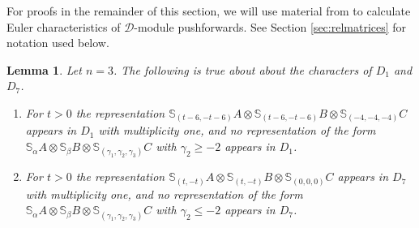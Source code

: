 \documentclass[11pt,reqno]{amsart}
\newcommand{\D}{\mathcal{D}}
\newcommand{\oo}{\otimes}
\newcommand{\bS}{\mathbb{S}}
\newtheorem{lemma}[theorem]{Lemma}
\numberwithin{equation}{section}
\begin{document}
For proofs in the remainder of this section, we will use material from \cite[Section 2]{raicu2016characters} to calculate Euler characteristics of $\D$-module pushforwards. See Section \ref{sec:relmatrices} for notation used below.


\begin{lemma}\label{lem:charD17n3}
Let $n=3$. The following is true about about the characters of $D_1$ and $D_7$.
\begin{enumerate}
\item For $t>0$ the representation $\bS_{(t-6,-t-6)}A\oo \bS_{(t-6,-t-6)}B \oo \bS_{(-4,-4,-4)}C$ appears in $D_1$ with multiplicity one, and no representation of the form $\bS_{\alpha}A\oo \bS_{\beta}B \oo \bS_{(\gamma_1,\gamma_2,\gamma_3)}C$ with $\gamma_2\geq-2$ appears in $D_1$.
\item For $t>0$ the representation $\bS_{(t,-t)}A\oo \bS_{(t,-t)}B \oo \bS_{(0,0,0)}C$ appears in $D_7$ with multiplicity one, and no representation of the form $\bS_{\alpha}A\oo \bS_{\beta}B \oo \bS_{(\gamma_1,\gamma_2,\gamma_3)}C$ with $\gamma_2\leq -2$ appears in $D_7$.
\end{enumerate}
\end{lemma}
\end{document}
